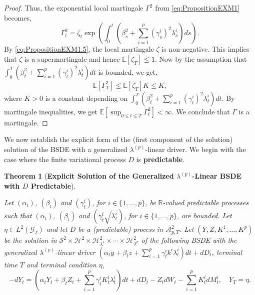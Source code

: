 \documentclass[11pt,a4paper]{article}
\numberwithin{equation}{section}
\theoremstyle{newPlain}
\newtheorem{theorem}{Theorem}[section]
\theoremstyle{newDefinition}
\theoremstyle{newRemark}
\begin{document}
{\begin{proof}
    Thus, the exponential local martingale $\Gamma^2$ from \eqref{eq:PropositionEXM1} becomes,
    \begin{equation}\label{eq:PropositionEXM2}
        \Gamma_t^2 = \zeta_t\exp\left(\int_0^t\left(\beta_s^2+\sum_{i=1}^p(\gamma_s^i)^2\lambda_s^i\right)ds\right).
    \end{equation}
    By \eqref{eq:PropositionEXM1.5}, the local martingale $\zeta$ is non-negative. This implies that $\zeta$ is a supermartingale and hence $\mathbb{E}[\zeta_T] \le 1$. Now by the assumption that $\int_0^T(\beta_t^2 + \sum_{i=1}^p(\gamma_t^i)^2\lambda_t^i)dt$ is bounded, we get,
    \begin{equation*}
        \mathbb{E}[\Gamma_T^2]\le\mathbb{E}[\zeta_T]K \le K,
    \end{equation*}
    where $K>0$ is a constant depending on $\int_0^T(\beta_t^2 + \sum_{i=1}^p(\gamma_t^i)^2\lambda_t^i)dt$.
    By martingale inequalities, we get $\mathbb{E}[\sup_{0\le t \le T}\Gamma_t^2]<\infty$. We conclude that $\Gamma$ is a martingale.
\end{proof}

We now establish the explicit form of the (first component of the solution) solution of the  BSDE with a generalized $\lambda^{(p)}$-linear driver. We begin with the case where the finite variational process $D$ is \textbf{predictable}.

\begin{theorem}[\textbf{Explicit Solution of the Generalized $\lambda^{(p)}$-Linear BSDE with $D$ Predictable}]\label{theorem:RRGLB}

    Let $(\alpha_t)$, $(\beta_t)$ and $(\gamma_t^i)$, for  $i\in\{1,\ldots,p\}$, be $\mathbb{R}$-valued predictable processes such that $(\alpha_t)$, $(\beta_t)$ and $(\gamma_t^i\sqrt{\lambda_t^i})$, for $i\in\{1,\ldots,p\}$, are bounded.
    Let $\eta\in L^2(\mathcal{G}_T)$ and let $D$ be a (predictable) process  in  $\mathcal{A}_{p,T}^2$.
    Let $(Y,Z,K^1,\ldots,K^p)$ be the solution in $\mathcal{S}^2\times\mathcal{H}^2\times\mathcal{H}_{\lambda^1}^2\times\cdots\times\mathcal{H}_{\lambda^p}^2$ of the following  BSDE  with the generalized $\lambda^{(p)}$-linear driver $(\alpha_ty + \beta_tz+\sum_{i=1}^p\gamma_t^ik^i\lambda_t^i)dt + dD_t$, terminal time $T$ and terminal condition $\eta$,
    \begin{equation}\label{eq:ThmDpred1}
        -dY_t = \left(\alpha_tY_t + \beta_tZ_t + \sum_{i=1}^p\gamma_t^iK_t^i\lambda_t^i\right)dt + dD_t - Z_tdW_t - \sum_{i=1}^pK_t^idM_t^i,\quad Y_T = \eta.
    \end{equation}


\end{theorem}}
\end{document}
